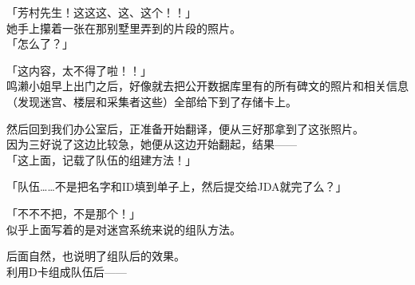 「芳村先生！这这这、这、这个！！」\\

她手上攥着一张在那别墅里弄到的片段的照片。\\

「怎么了？」

「这内容，太不得了啦！！」\\

鸣濑小姐早上出门之后，好像就去把公开数据库里有的所有碑文的照片和相关信息（发现迷宫、楼层和采集者这些）全部给下到了存储卡上。

然后回到我们办公室后，正准备开始翻译，便从三好那拿到了这张照片。\\

因为三好说了这边比较急，她便从这边开始翻起，结果——\\

「这上面，记载了队伍的组建方法！」

「队伍……不是把名字和ID填到单子上，然后提交给JDA就完了么？」

「不不不把，不是那个！」\\

似乎上面写着的是对迷宫系统来说的组队方法。

后面自然，也说明了组队后的效果。\\

利用D卡组成队伍后——\\

